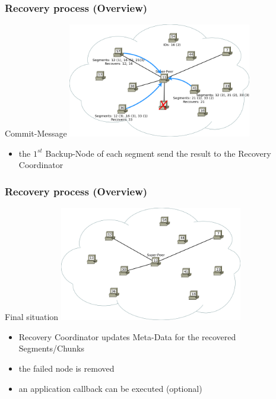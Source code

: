 \documentclass{beamer}
\begin{document}
	\begin{frame}
		\frametitle{Recovery process (Overview)}

		\begin{block}{Commit-Message}
			\center\includegraphics[width=8cm]{./img/Recovery_Overview_05}

			\begin{itemize}
				\item the $1^{st}$ Backup-Node of each segment send the result to the Recovery Coordinator
			\end{itemize}
		\end{block}
	\end{frame}

	\begin{frame}
		\frametitle{Recovery process (Overview)}

		\begin{block}{Final situation}
			\center\includegraphics[width=8cm]{./img/Recovery_Overview_06}

			\begin{itemize}
				\item Recovery Coordinator updates Meta-Data for the recovered Segments/Chunks
				\item the failed node is removed
				\item an application callback can be executed (optional)
			\end{itemize}
		\end{block}
	\end{frame}
\end{document}
